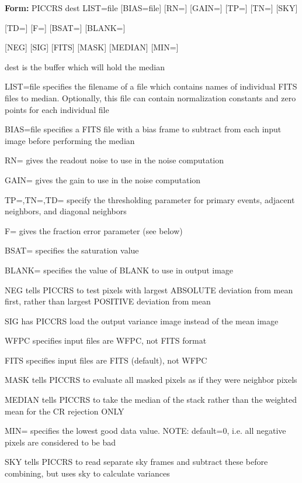 {\newpage\clearpage
{}%
\begin{command}
  \item[\textbf{Form: }PICCRS dest LIST=file {[BIAS=file]} {[RN=]} {[GAIN=]} 
       {[TP=]} {[TN=]} {[SKY]}\hfill]{}
  \item{{[TD=]} {[F=]} {[BSAT=]} {[BLANK=]} }
  \item{{[NEG]} {[SIG]} {[FITS]} {[MASK]} {[MEDIAN]} {[MIN=]}}
  \item[dest]{is the buffer which will hold the median}
  \item[LIST=file]{specifies the filename of a file which contains
       names of individual FITS files to median. Optionally,
       this file can contain normalization constants and
       zero points for each individual file}
  \item[BIAS=file]{specifies a FITS file with a bias frame to subtract
       from each input image before performing the median}
  \item[RN=]{gives the readout noise to use in the noise computation}
  \item[GAIN=]{gives the gain to use in the noise computation}
  \item[TP=,TN=,TD=]{specify the thresholding parameter for primary events,
                        adjacent neighbors, and diagonal neighbors}
  \item[F=]{gives the fraction error parameter (see below) }
  \item[BSAT=]{specifies the saturation value}
  \item[BLANK=]{specifies the value of BLANK to use in output image}
  \item[NEG]{tells PICCRS to test pixels with largest ABSOLUTE
       deviation from mean first, rather than largest
       POSITIVE deviation from mean}
  \item[SIG]{has PICCRS load the output variance image instead of 
       the mean image}
  \item[WFPC]{specifies input files are WFPC, not FITS format}
  \item[FITS]{specifies input files are FITS (default), not WFPC }
  \item[MASK]{tells PICCRS to evaluate all masked pixels as if
                        they were neighbor pixels}
  \item[MEDIAN]{tells PICCRS to take the median of the stack rather
                        than the weighted mean for the CR rejection ONLY}
  \item[MIN=]{specifies the lowest good data value. NOTE: default=0,
                        i.e. all negative pixels are considered to be bad}
  \item[SKY]{tells PICCRS to read separate sky frames and subtract these
            before combining, but uses sky to calculate variances}
\end{command}%
\lthtmlfigureZ
\lthtmlcheckvsize\clearpage}

